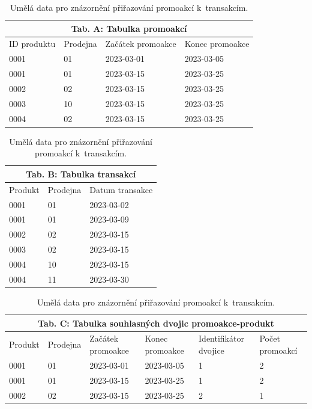 \begin{table}[hbtp!]
    \centering
    \captionsetup{justification=centering}
    \caption{Umělá data pro znázornění přiřazování promoakcí k~transakcím.}
    \begin{tabular}{llll}
    \multicolumn{4}{c}{Tab. A: Tabulka promoakcí } \\
    \toprule
    ID produktu & Prodejna & Začátek promoakce & Konec promoakce  \\
    \midrule
    0001 & 01 & 2023-03-01 & 2023-03-05 \\
    0001 & 01 & 2023-03-15 & 2023-03-25 \\
    0002 & 02 & 2023-03-15 & 2023-03-25 \\
    0003 & 10 & 2023-03-15 & 2023-03-25 \\
    0004 & 02 & 2023-03-15 & 2023-03-25 \\
    \bottomrule
    \end{tabular}
\bigskip
    \begin{tabular}{lll}
        \multicolumn{3}{c}{Tab. B: Tabulka transakcí} \\
        \toprule
        Produkt & Prodejna & Datum transakce  \\
        \midrule
        0001 & 01 & 2023-03-02  \\
        0001 & 01 & 2023-03-09  \\
        0002 & 02 & 2023-03-15 \\
        0003 & 02 & 2023-03-15 \\
        0004 & 10 & 2023-03-15 \\
        0004 & 11 & 2023-03-30 \\
        \bottomrule
    \end{tabular}
\bigskip
    \begin{tabular}{llp{2cm}p{2.2cm}p{2cm}p{2cm}}
        \multicolumn{6}{c}{Tab. C: Tabulka souhlasných dvojic promoakce-produkt} \\
        \toprule
        Produkt & Prodejna & Začátek promoakce & Konec \newline promoakce& Identifikátor dvojice & Počet \newline  promoakcí\\
        \midrule
        0001 & 01 & 2023-03-01 & 2023-03-05 & 1 & 2\\
        0001 & 01 & 2023-03-15 & 2023-03-25 & 1 & 2\\
        0002 & 02 & 2023-03-15 & 2023-03-25 & 2 & 1\\
        \bottomrule

\end{tabular}
\end{table}
